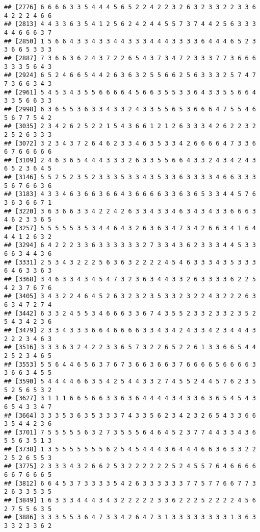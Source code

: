 \documentclass[
]{article}
\begin{document}
\begin{verbatim}
## [2776] 6 6 6 6 3 3 5 4 4 4 5 6 5 2 2 4 2 2 3 2 6 3 2 3 3 2 2 3 3 6 4 2 2 2 4 6 6
## [2813] 4 4 3 3 6 3 5 4 1 2 5 6 2 4 2 4 4 5 5 7 3 7 4 4 2 5 6 3 3 3 4 4 6 6 6 3 7
## [2850] 1 5 6 6 4 3 3 4 3 3 4 4 3 3 3 4 4 4 3 3 3 3 6 4 4 4 6 5 2 3 3 6 6 5 3 3 3
## [2887] 7 3 6 6 3 6 2 4 3 7 2 2 6 5 4 3 7 3 4 7 2 3 3 3 7 7 3 6 6 6 3 3 3 5 6 4 3
## [2924] 6 5 2 4 6 6 5 4 4 2 6 3 6 3 2 5 5 6 6 2 5 6 3 3 3 2 5 7 4 7 7 3 6 6 3 4 3
## [2961] 5 4 5 3 4 3 5 5 6 6 6 6 4 5 6 6 3 5 5 3 3 6 4 3 3 5 5 6 6 4 3 3 5 6 6 3 3
## [2998] 6 3 6 5 5 3 6 3 3 4 3 3 2 4 3 3 5 5 6 5 3 6 6 6 4 7 5 5 4 6 5 6 7 7 5 4 2
## [3035] 2 3 4 2 6 2 5 2 2 1 5 4 3 6 6 1 2 1 2 6 3 3 3 4 2 6 2 2 3 2 2 5 2 6 3 3 3
## [3072] 3 2 3 4 3 7 2 6 4 6 2 3 3 4 6 3 5 3 3 4 2 6 6 6 6 4 7 3 3 6 6 7 6 6 6 6 6
## [3109] 2 4 6 3 6 5 4 4 4 3 3 3 2 6 3 3 5 5 6 6 4 3 3 2 4 3 4 2 4 3 6 5 2 3 6 4 5
## [3146] 5 5 2 5 2 3 5 2 3 3 3 5 3 3 4 3 5 3 3 6 3 3 3 3 4 6 6 3 3 3 5 6 7 6 6 3 6
## [3183] 4 3 3 4 6 3 6 6 3 6 6 4 3 6 6 6 6 3 3 6 3 6 5 3 3 4 4 5 7 6 3 6 3 6 6 7 1
## [3220] 3 6 3 6 6 3 3 4 2 2 4 2 6 3 3 4 3 3 4 6 3 4 3 4 3 3 6 6 6 3 4 6 2 3 3 6 5
## [3257] 5 5 5 5 5 3 5 3 4 4 6 4 3 2 6 3 6 3 4 7 3 4 2 6 6 3 4 1 6 4 4 4 1 2 6 3 2
## [3294] 6 4 2 2 2 3 3 6 3 3 3 3 3 3 2 7 3 3 4 3 6 2 3 3 3 4 4 5 3 3 6 6 3 4 4 3 6
## [3331] 2 5 3 4 3 2 2 2 5 6 3 6 3 2 2 2 2 4 5 4 6 3 3 3 4 3 5 3 3 3 6 4 6 3 3 6 3
## [3368] 3 4 6 3 3 4 3 4 5 4 7 3 2 3 6 3 4 4 3 3 2 6 3 3 3 3 6 2 2 5 4 2 3 7 6 7 6
## [3405] 3 4 3 2 2 4 6 4 5 2 6 3 2 3 2 3 5 3 3 2 3 2 2 4 3 2 2 2 6 3 6 3 4 7 2 7 4
## [3442] 6 3 3 2 4 5 5 3 4 6 6 6 3 3 6 7 4 3 5 5 2 3 3 2 3 3 2 3 5 2 5 4 3 4 2 3 6
## [3479] 2 3 3 4 3 3 3 6 6 4 6 6 6 6 3 3 4 3 4 2 4 3 3 4 2 3 4 4 4 3 2 2 2 3 4 6 3
## [3516] 3 3 3 6 3 2 4 2 2 3 3 6 5 7 3 2 2 6 5 2 2 6 1 3 3 6 6 5 4 4 2 5 2 3 4 6 5
## [3553] 5 5 6 4 4 6 5 6 3 7 6 7 3 6 6 3 6 6 3 7 6 6 6 6 5 6 6 6 6 3 3 6 6 3 4 5 5
## [3590] 5 4 4 4 4 6 6 3 5 4 2 5 4 4 3 3 2 7 4 5 5 2 4 4 5 7 6 2 3 5 5 2 5 6 5 3 2
## [3627] 3 1 1 1 6 6 5 6 6 3 3 6 3 6 4 4 4 4 3 4 3 3 6 3 6 5 4 5 4 3 6 5 4 3 3 4 7
## [3664] 3 3 3 5 3 6 3 5 3 3 3 7 4 3 3 5 6 2 3 4 2 3 2 6 5 4 3 3 6 6 3 5 4 4 2 3 6
## [3701] 7 5 5 5 5 5 6 3 2 7 3 5 5 5 6 4 6 4 5 2 3 7 7 4 4 3 3 4 3 6 5 5 6 3 5 1 3
## [3738] 1 3 5 5 5 5 5 5 5 6 2 5 4 5 4 4 4 3 6 4 4 4 6 6 3 6 3 3 2 2 2 5 2 6 5 5 3
## [3775] 2 3 3 3 4 3 2 6 6 2 5 3 2 2 2 2 2 2 5 2 4 5 5 7 6 4 6 6 6 6 6 6 7 6 6 6 5
## [3812] 6 6 4 5 3 7 3 3 3 3 5 4 2 6 3 3 3 3 3 3 7 7 5 7 7 6 6 7 7 3 2 6 3 3 5 3 5
## [3849] 1 6 3 3 3 4 4 4 3 4 3 2 2 2 2 2 3 3 6 2 2 2 5 2 2 2 2 4 5 6 2 7 5 5 6 3 5
## [3886] 3 3 3 5 5 3 6 4 7 3 3 4 2 6 4 7 3 1 3 3 3 3 3 3 3 3 1 3 6 3 3 3 2 3 3 6 2

\end{verbatim}
\end{document}
